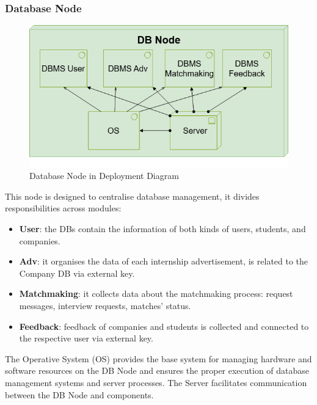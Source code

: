 \subsubsection{Database Node}
\begin{figure}[H]
    \centering
    \includegraphics[width=15cm]{images/architectural design/deployment/depl-dbnode.drawio.png}
    \caption{Database Node in Deployment Diagram}
\end{figure}
This node is designed to centralise database management, it divides responsibilities across modules:
\begin{itemize}
    \item \textbf{User}: the DBs contain the information of both kinds of users, students, and companies.
    \item \textbf{Adv}: it organises the data of each internship advertisement, is related to the Company DB via external key.
    \item \textbf{Matchmaking}: it collects data about the matchmaking process: request messages, interview requests, matches' status.
    \item \textbf{Feedback}: feedback of companies and students is collected and connected to the respective user via external key.
\end{itemize}
The Operative System (OS) provides the base system for managing hardware and software resources on the DB Node and ensures the proper execution of database management systems and server processes. The Server facilitates communication between the DB Node and components.
